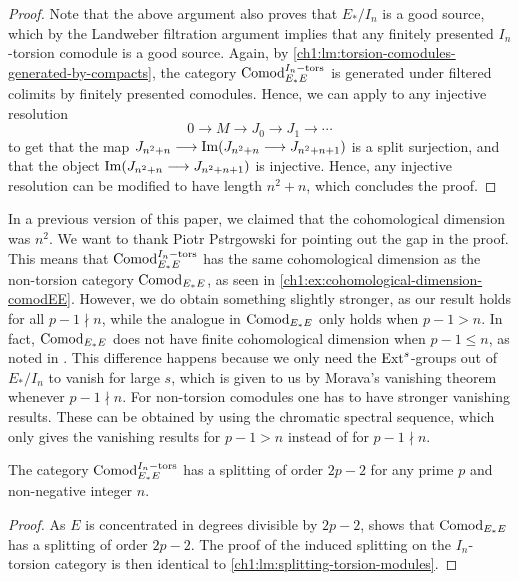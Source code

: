 \begin{proof}
    Note that the above argument also proves that $E_*/I_n$ is a good source, which by the Landweber filtration argument implies that any finitely presented $I_n$-torsion comodule is a good source. Again, by \cref{ch1:lm:torsion-comodules-generated-by-compacts}, the category $\mathrm{Comod}_{E_*E}^{I_n-\mathrm{tors}}$ is generated under filtered colimits by finitely presented comodules. Hence, we can apply \cite[2.4]{pstragowski_2021} to any injective resolution 
    \[0\longrightarrow M \longrightarrow J_0 \longrightarrow J_1\longrightarrow \cdots\]
    to get that the map $J_{n^2+n}\longrightarrow \operatorname{Im}(J_{n^2+n}\longrightarrow J_{n^2+n+1})$ is a split surjection, and that the object $\operatorname{Im}(J_{n^2+n}\longrightarrow J_{n^2+n+1})$ is injective. Hence, any injective resolution can be modified to have length $n^2+n$, which concludes the proof. 
\end{proof}

\begin{remark}
    In a previous version of this paper, we claimed that the cohomological dimension was $n^2$. We want to thank Piotr Pstr\a{}gowski for pointing out the gap in the proof. This means that $\mathrm{Comod}_{E_*E}^{I_n-\mathrm{tors}}$ has the same cohomological dimension as the non-torsion category $\mathrm{Comod}_{E_*E}$, as seen in \cref{ch1:ex:cohomological-dimension-comodEE}. However, we do obtain something slightly stronger, as our result holds for all $p-1\nmid n$, while the analogue in $\mathrm{Comod}_{E_*E}$ only holds when $p-1>n$. In fact, $\mathrm{Comod}_{E_*E}$ does not have finite cohomological dimension when $p-1\leq n$, as noted in \cite[2.6]{pstragowski_2021}. This difference happens because we only need the $\operatorname{Ext}^s$-groups out of $E_*/I_n$ to vanish for large $s$, which is given to us by Morava's vanishing theorem whenever $p-1\nmid n$. For non-torsion comodules one has to have stronger vanishing results. These can be obtained by using the chromatic spectral sequence, which only gives the vanishing results for $p-1>n$ instead of for $p-1\nmid n$. 
\end{remark}

\begin{lemma}
    \label{ch1:lm:splitting-torsion-comodules}
    The category $\mathrm{Comod}_{E_*E}^{I_n-\mathrm{tors}}$ has a splitting of order $2p-2$ for any prime $p$ and non-negative integer $n$.
\end{lemma}
\begin{proof}
    As $E$ is concentrated in degrees divisible by $2p-2$, \cite[8.13]{patchkoria-pstragowski_2021} shows that $\mathrm{Comod}_{E_*E}$ has a splitting of order $2p-2$. The proof of the induced splitting on the $I_n$-torsion category is then identical to \cref{ch1:lm:splitting-torsion-modules}. 
\end{proof}

